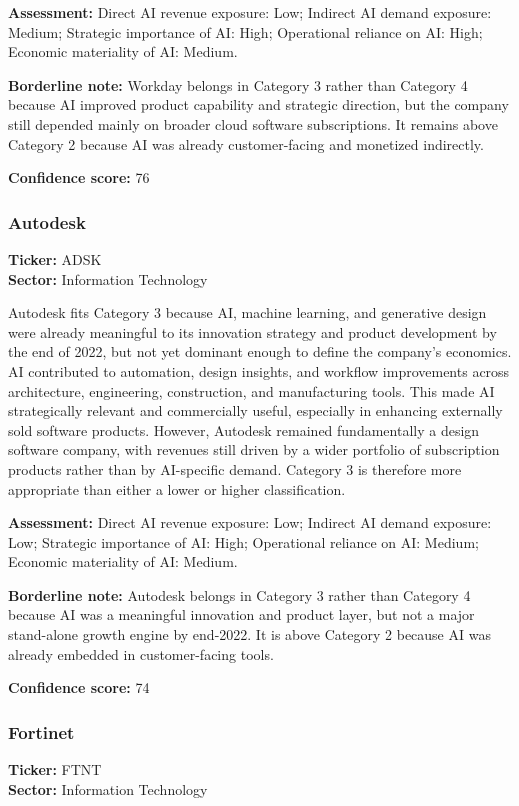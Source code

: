 \documentclass{article}
\begin{document}
\textbf{Assessment:} Direct AI revenue exposure: Low; Indirect AI demand exposure: Medium; Strategic importance of AI: High; Operational reliance on AI: High; Economic materiality of AI: Medium.

\textbf{Borderline note:} Workday belongs in Category 3 rather than Category 4 because AI improved product capability and strategic direction, but the company still depended mainly on broader cloud software subscriptions. It remains above Category 2 because AI was already customer-facing and monetized indirectly.

\textbf{Confidence score:} 76

\subsubsection*{Autodesk}
\textbf{Ticker:} ADSK \\
\textbf{Sector:} Information Technology

Autodesk fits Category 3 because AI, machine learning, and generative design were already meaningful to its innovation strategy and product development by the end of 2022, but not yet dominant enough to define the company’s economics. AI contributed to automation, design insights, and workflow improvements across architecture, engineering, construction, and manufacturing tools. This made AI strategically relevant and commercially useful, especially in enhancing externally sold software products. However, Autodesk remained fundamentally a design software company, with revenues still driven by a wider portfolio of subscription products rather than by AI-specific demand. Category 3 is therefore more appropriate than either a lower or higher classification.

\textbf{Assessment:} Direct AI revenue exposure: Low; Indirect AI demand exposure: Low; Strategic importance of AI: High; Operational reliance on AI: Medium; Economic materiality of AI: Medium.

\textbf{Borderline note:} Autodesk belongs in Category 3 rather than Category 4 because AI was a meaningful innovation and product layer, but not a major stand-alone growth engine by end-2022. It is above Category 2 because AI was already embedded in customer-facing tools.

\textbf{Confidence score:} 74

\subsubsection*{Fortinet}
\textbf{Ticker:} FTNT \\
\textbf{Sector:} Information Technology
\end{document}
